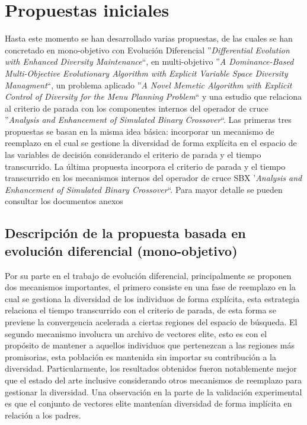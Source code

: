 \section{Propuestas iniciales}

Hasta este momento se han desarrollado varias propuestas, de las cuales se han concretado en mono-objetivo con Evolución Diferencial ''\textit{Differential Evolution with Enhanced Diversity Maintenance}``, en multi-objetivo ''\textit{A Dominance-Based Multi-Objective Evolutionary Algorithm with Explicit Variable Space Diversity Managment}``, un problema aplicado ''\textit{A Novel Memetic Algorithm with Explicit Control of Diversity for the Menu Planning Problem}`` y una estudio que relaciona al criterio de parada con los componentes internos del operador de cruce ''\textit{Analysis and Enhancement of Simulated Binary Crossover}``.
%
Las primeras tres propuestas se basan en la misma idea básica: incorporar un mecanismo de reemplazo en el cual se gestione la diversidad de forma explícita en el espacio de las variables de decisión considerando el criterio de parada y el tiempo transcurrido.
%
La última propuesta incorpora el criterio de parada y el tiempo transcurrido en los mecanismos internos del operador de cruce SBX '\textit{Analysis and Enhancement of Simulated Binary Crossover}``.
%
Para mayor detalle se pueden consultar los documentos anexos

\subsection{Descripción de la propuesta basada en evolución diferencial (mono-objetivo)}

Por su parte en el trabajo de evolución diferencial, principalmente se proponen dos mecanismos importantes, el primero consiste en una fase de reemplazo en la cual se gestiona la diversidad de los individuos de forma explícita, esta estrategia relaciona el tiempo transcurrido con el criterio de parada, de esta forma se previene la convergencia acelerada a ciertas regiones del espacio de búsqueda.
%
El segundo mecanismo involucra un archivo de vectores elite, esto es con el propósito de mantener a aquellos individuos que pertenezcan a las regiones más promisorias, esta población es mantenida sin importar su contribución a la diversidad.
%
Particularmente, los resultados obtenidos fueron notablemente mejor que el estado del arte inclusive considerando otros mecanismos de reemplazo para gestionar la diversidad.
%
Una observación en la parte de la validación experimental es que el conjunto de vectores elite mantenían diversidad de forma implícita en relación a los padres.

